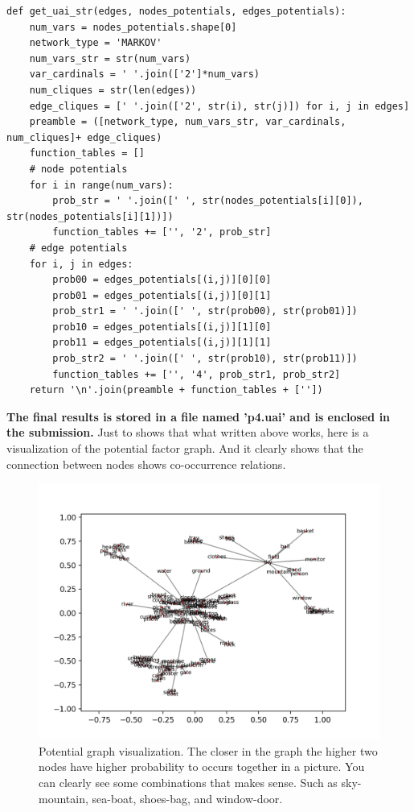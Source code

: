 \documentclass{article}
\begin{document}
\begin{enumerate}
\begin{verbatim}
def get_uai_str(edges, nodes_potentials, edges_potentials):
    num_vars = nodes_potentials.shape[0]
    network_type = 'MARKOV'
    num_vars_str = str(num_vars)
    var_cardinals = ' '.join(['2']*num_vars)
    num_cliques = str(len(edges))
    edge_cliques = [' '.join(['2', str(i), str(j)]) for i, j in edges]
    preamble = ([network_type, num_vars_str, var_cardinals, num_cliques]+ edge_cliques)
    function_tables = []
    # node potentials
    for i in range(num_vars):
        prob_str = ' '.join([' ', str(nodes_potentials[i][0]), str(nodes_potentials[i][1])])
        function_tables += ['', '2', prob_str]
    # edge potentials
    for i, j in edges:
        prob00 = edges_potentials[(i,j)][0][0]
        prob01 = edges_potentials[(i,j)][0][1]
        prob_str1 = ' '.join([' ', str(prob00), str(prob01)])
        prob10 = edges_potentials[(i,j)][1][0]
        prob11 = edges_potentials[(i,j)][1][1]
        prob_str2 = ' '.join([' ', str(prob10), str(prob11)])
        function_tables += ['', '4', prob_str1, prob_str2]
    return '\n'.join(preamble + function_tables + [''])
\end{verbatim}
\textbf{The final results is stored in a file named 'p4.uai' and is enclosed in the submission.}
Just to shows that what written above works, here is a visualization of the potential factor graph. And it clearly shows that the connection between nodes shows co-occurrence relations.
\begin{figure}[ht]
\centering
\includegraphics[width=5.8in]{p4.png}
\vspace{-8mm}
\caption{Potential graph visualization. The closer in the graph the higher two nodes have higher probability to occurs together in a picture. You can clearly see some combinations that makes sense. Such as sky-mountain, sea-boat, shoes-bag, and window-door.}
\end{figure}


\end{enumerate}
\end{document}
